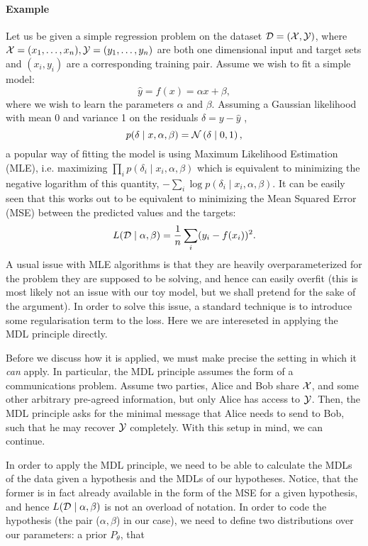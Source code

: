 \paragraph{Example}
Let us be given a simple regression problem on the dataset $\mathcal{D} = (\mathcal{X}, \mathcal{Y})$,
where $\mathcal{X} = (x_1, \hdots, x_n), \mathcal{Y} = (y_1, \hdots, y_n)$ are both one
dimensional input and target sets and $(x_i, y_i)$ are a corresponding training
pair. Assume we wish to fit a simple model:
\[
  \hat{y} = f(x) = \alpha x + \beta,
\]
where we wish to learn the parameters $\alpha$ and $\beta$.
Assuming a Gaussian likelihood with mean 0 and variance 1 on the residuals $\delta
= y - \hat{y}$ ,
\[
  p(\delta \mid x, \alpha, \beta) = \mathcal{N}\left( \delta \mid 0, 1 \right),
\]
a popular way of fitting the model is using Maximum Likelihood Estimation (MLE),
i.e. maximizing $\prod_i p(\delta_i \mid x_i, \alpha, \beta)$ which is equivalent to
minimizing the negative logarithm of this quantity, $-\sum_i \log p(\delta_i \mid
x_i, \alpha, \beta)$. It can be easily seen that this works out to be equivalent
to minimizing the Mean Squared Error (MSE) between the predicted values and the
targets:
\[
  L(\mathcal{D} \mid \alpha, \beta) = \frac{1}{n} \sum_i (y_i - f(x_i))^2.
\]
A usual issue with MLE algorithms is that they are heavily overparameterized for
the problem they are supposed to be solving, and hence can easily overfit (this
is most likely not an issue with our toy model, but we shall pretend for the
sake of the argument). In order to solve this issue, a standard technique is to
introduce some regularisation term to the loss. Here we are intereseted in
applying the MDL principle directly.
\par
Before we discuss how it is applied, we must make precise the setting in which
it \textit{can} apply. In particular, the MDL principle assumes the form of a
communications problem. Assume two parties, Alice and Bob share $\mathcal{X}$, and some
other arbitrary pre-agreed information, but only Alice has access to $\mathcal{Y}$. Then,
the MDL principle asks for the minimal message that Alice needs to send to Bob,
such that he may recover $\mathcal{Y}$ completely. With this setup in mind, we can continue.
\par
In order to apply the MDL principle, we need to be able to calculate the
MDLs of the data given a hypothesis and the MDLs of our hypotheses.
Notice, that the former is in fact already available
in the form of the MSE for a given hypothesis, and hence $L(\mathcal{D} \mid \alpha,
\beta)$ is not an overload of notation. In order to code the hypothesis
(the pair ($\alpha, \beta$) in our
case), we need to define two distributions over our parameters: a prior $P_\theta$, that
